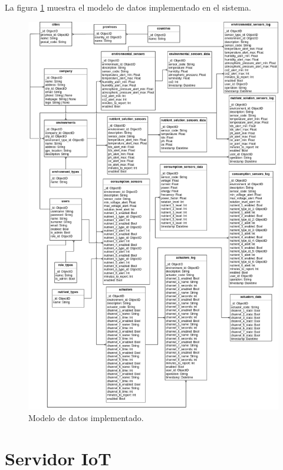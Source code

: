 La figura \ref{fig:modelo de datos} muestra el modelo de datos implementado en
el sistema.
\begin{figure}[H]
    \centering
    \includegraphics[width=.99\textwidth]{./Images/15.png}
    \caption{Modelo de datos implementado.}
    \label{fig:modelo de datos}
\end{figure}

\section{Servidor IoT}

